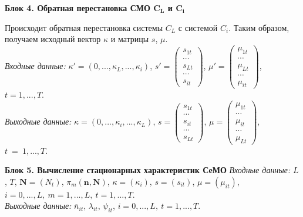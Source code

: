 \documentclass[a4paper,14pt]{extarticle}
\theoremstyle{note}
\begin{document}
\medskip
\textbf{Блок 4. Обратная перестановка СМО $\boldsymbol{C_L}$ и $\boldsymbol{C_i}$}

Происходит обратная перестановка системы $C_ L$ с системой $C_i$. Таким образом, получаем исходный вектор $\kappa$ и матрицы $s$, $\mu$. \\
\textit{Входные данные:} $\kappa'=(0,...,\kappa_L,...,\kappa_i)$, $s'=\left( \begin{matrix}
s_{1t}\\
\cdots\\
s_{Lt}\\
\cdots\\
s_{it}
\end{matrix} \right )$, $\mu'=\left( \begin{matrix}
\mu_{1t}\\
\cdots\\
\mu_{Lt}\\
\cdots\\
\mu_{it}
\end{matrix} \right )$, $t=1,...,T$. \\
\textit{Выходные данные:} $\kappa=(0,...,\kappa_i,...,\kappa_L)$, $s=\left( \begin{matrix}
s_{1t}\\
\cdots\\
s_{it}\\
\cdots\\
s_{Lt}
\end{matrix} \right )$, $\mu=\left( \begin{matrix}
\mu_{1t}\\
\cdots\\
\mu_{it}\\
\cdots\\
\mu_{Lt}
\end{matrix} \right )$, $t~=~1,...,T$.

\medskip
\textbf{Блок 5. Вычисление стационарных характеристик СеМО}
\emph{Входные данные:} $L$, $T$, $\mathbf{N}=(N_t)$, $\pi_m(\mathbf{n},\mathbf{N})$, $\kappa=(\kappa_i)$, $s=(s_{it})$, $\mu=(\mu_{it})$, $i=0,...,L,~m=1,...,L,~t=1,...,T$.\\
\emph{Выходные данные:} $\overline{n}_{it}$, $\lambda_{it}$, $\psi_{it}$, $i=0,...,L,~t=1,...,T$.
\end{document}
